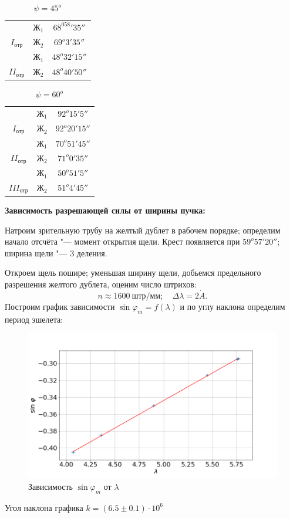 \documentclass[10pt, a4paper]{article}
\begin{document}
\begin{table}[H]	
\begin{center}
\begin{tabular}{|c|c|c|} \hline
& $Ж_1$ & $68^058'35''$\\
\cline{2-3}
$I_{отр}$
& $Ж_2$ & $69^o3'35''$ \\\hline
& $Ж_1$ & $48^o32'15''$ \\
\cline{2-3}
$II_{отр}$
& $Ж_2$ & $48^o40'50''$ \\\hline
\end{tabular}
\caption{$\psi = 45^o$}
\end{center}
\end{table}

\begin{table}[H]	
\begin{center}
\begin{tabular}{|c|c|c|} \hline
& $Ж_1$ & $92^o15'5''$\\
\cline{2-3}
$I_{отр}$
& $Ж_2$ & $92^o20'15''$ \\\hline
& $Ж_1$ & $70^o51'45''$ \\
\cline{2-3}
$II_{отр}$
& $Ж_2$ & $71^o0'35''$ \\\hline
& $Ж_1$ & $50^o51'5''$\\
\cline{2-3}
$III_{отр}$
& $Ж_2$ & $51^o4'45''$ \\\hline
\end{tabular}
\caption{$\psi = 60^o$}
\end{center}
\end{table}
\textbf{Зависимость разрешающей силы от ширины пучка:}

Натроим зрительную трубу на желтый дублет в рабочем порядке; определим начало отсчёта "--- момент открытия щели. Крест появляется при $59^o57'20''$; ширина щели "--- 3 деления.

Откроем щель пошире; уменьшая ширину щели, добьемся предельного разрешения желтого дублета, оценим число штрихов:
\[
	 n \approx 1600\ штр/мм; \quad \Delta \lambda = 2 \dot A.
\]
Построим график зависимости $\sin \varphi_m = f(\lambda)$ и по углу наклона определим период эшелета:
\begin{figure}[H]
	\includegraphics[width = 1.0\linewidth]{g1.png}
	\caption*{Зависимость $\sin \varphi_m$ от $\lambda$}
\end{figure}
Угол наклона графика $k = (6.5 \pm 0.1)\cdot 10^6$
\end{document}
